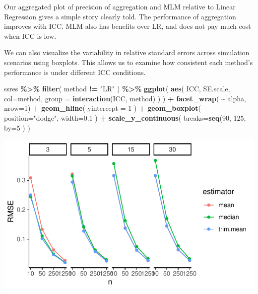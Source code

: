 \documentclass[
]{book}
\newenvironment{Shaded}{\begin{snugshade}}{\end{snugshade}}
\newcommand{\AttributeTok}[1]{\textcolor[rgb]{0.13,0.29,0.53}{#1}}
\newcommand{\DecValTok}[1]{\textcolor[rgb]{0.00,0.00,0.81}{#1}}
\newcommand{\FloatTok}[1]{\textcolor[rgb]{0.00,0.00,0.81}{#1}}
\newcommand{\FunctionTok}[1]{\textcolor[rgb]{0.13,0.29,0.53}{\textbf{#1}}}
\newcommand{\NormalTok}[1]{#1}
\newcommand{\SpecialCharTok}[1]{\textcolor[rgb]{0.81,0.36,0.00}{\textbf{#1}}}
\newcommand{\StringTok}[1]{\textcolor[rgb]{0.31,0.60,0.02}{#1}}
\begin{document}
Our aggregated plot of precision of aggregation and MLM relative to Linear Regression gives a simple story clearly told.
The performance of aggregation improves with ICC.
MLM also has benefits over LR, and does not pay much cost when ICC is low.

We can also visualize the variability in relative standard errors across simulation scenarios using boxplots.
This allows us to examine how consistent each method's performance is under different ICC conditions.

\begin{Shaded}
\begin{Highlighting}[]
\NormalTok{ssres }\SpecialCharTok{\%\textgreater{}\%} 
  \FunctionTok{filter}\NormalTok{( method }\SpecialCharTok{!=} \StringTok{"LR"}\NormalTok{ ) }\SpecialCharTok{\%\textgreater{}\%}
  \FunctionTok{ggplot}\NormalTok{( }\FunctionTok{aes}\NormalTok{( ICC, SE.scale, }\AttributeTok{col=}\NormalTok{method, }
               \AttributeTok{group =} \FunctionTok{interaction}\NormalTok{(ICC, method) ) ) }\SpecialCharTok{+}
  \FunctionTok{facet\_wrap}\NormalTok{( }\SpecialCharTok{\textasciitilde{}}\NormalTok{ alpha, }\AttributeTok{nrow=}\DecValTok{1}\NormalTok{) }\SpecialCharTok{+}
  \FunctionTok{geom\_hline}\NormalTok{( }\AttributeTok{yintercept =} \DecValTok{1}\NormalTok{  ) }\SpecialCharTok{+}
  \FunctionTok{geom\_boxplot}\NormalTok{( }\AttributeTok{position=}\StringTok{"dodge"}\NormalTok{, }\AttributeTok{width=}\FloatTok{0.1}\NormalTok{ ) }\SpecialCharTok{+}
  \FunctionTok{scale\_y\_continuous}\NormalTok{( }\AttributeTok{breaks=}\FunctionTok{seq}\NormalTok{(}\DecValTok{90}\NormalTok{, }\DecValTok{125}\NormalTok{, }\AttributeTok{by=}\DecValTok{5}\NormalTok{ ) ) }
\end{Highlighting}
\end{Shaded}

\begin{center}\includegraphics[width=0.75\linewidth]{Designing-Simulations-in-R_files/figure-latex/unnamed-chunk-182-1} \end{center}
\end{document}
